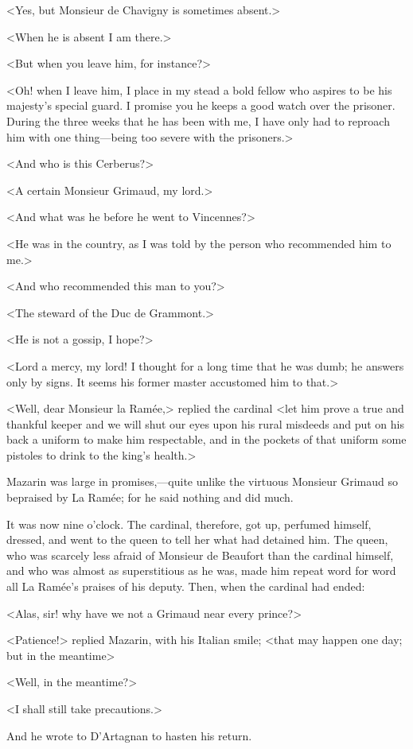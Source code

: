 <Yes, but Monsieur de Chavigny is sometimes absent.>

<When he is absent I am there.>

<But when you leave him, for instance?>

<Oh! when I leave him, I place in my stead a bold fellow who aspires to be his majesty's special guard. I promise you he keeps a good watch over the prisoner. During the three weeks that he has been with me, I have only had to reproach him with one thing—being too severe with the prisoners.>

<And who is this Cerberus?>

<A certain Monsieur Grimaud, my lord.>

<And what was he before he went to Vincennes?>

<He was in the country, as I was told by the person who recommended him to me.>

<And who recommended this man to you?>

<The steward of the Duc de Grammont.>

<He is not a gossip, I hope?>

<Lord a mercy, my lord! I thought for a long time that he was dumb; he answers only by signs. It seems his former master accustomed him to that.>

<Well, dear Monsieur la Ramée,> replied the cardinal <let him prove a true and thankful keeper and we will shut our eyes upon his rural misdeeds and put on his back a uniform to make him respectable, and in the pockets of that uniform some pistoles to drink to the king's health.>

Mazarin was large in promises,—quite unlike the virtuous Monsieur Grimaud so bepraised by La Ramée; for he said nothing and did much.

It was now nine o'clock. The cardinal, therefore, got up, perfumed himself, dressed, and went to the queen to tell her what had detained him. The queen, who was scarcely less afraid of Monsieur de Beaufort than the cardinal himself, and who was almost as superstitious as he was, made him repeat word for word all La Ramée's praises of his deputy. Then, when the cardinal had ended:

<Alas, sir! why have we not a Grimaud near every prince?>

<Patience!> replied Mazarin, with his Italian smile; <that may happen one day; but in the meantime\longdash>

<Well, in the meantime?>

<I shall still take precautions.>

And he wrote to D'Artagnan to hasten his return. 